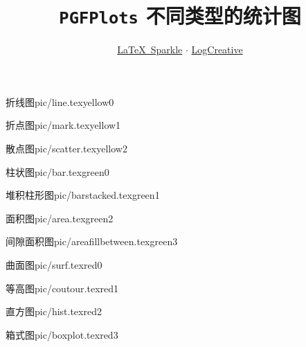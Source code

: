 \documentclass[a4paper,12pt]{article}
\title{\texttt{PGFPlots} 不同类型的统计图}
\author{\href{https://logcreative.github.io/LaTeXSparkle/index.html}{\LaTeX\ Sparkle} $\cdot$ \href{https://space.bilibili.com/31271993}{LogCreative}}
\date{}
\begin{document}
\begin{CJK}{UTF8}{song} %
    \maketitle

    \begin{graphbox}{折线图}{pic/line.tex}{yellow}{0}
    \end{graphbox}
    
    \begin{graphbox}{折点图}{pic/mark.tex}{yellow}{1}
    \end{graphbox}

    \begin{graphbox}{散点图}{pic/scatter.tex}{yellow}{2}
    \end{graphbox}

    \begin{graphbox}{柱状图}{pic/bar.tex}{green}{0}
    \end{graphbox}

    \begin{graphbox}{堆积柱形图}{pic/barstacked.tex}{green}{1}
    \end{graphbox}

    \begin{graphbox}{面积图}{pic/area.tex}{green}{2}
    \end{graphbox}

    \begin{graphbox}{间隙面积图}{pic/areafillbetween.tex}{green}{3}
    \end{graphbox}

    \begin{graphbox}{曲面图}{pic/surf.tex}{red}{0}
    \end{graphbox}

    \begin{graphbox}{等高图}{pic/coutour.tex}{red}{1}
    \end{graphbox}

    \begin{graphbox}{直方图}{pic/hist.tex}{red}{2}
    \end{graphbox}

    \begin{graphbox}{箱式图}{pic/boxplot.tex}{red}{3}
    \end{graphbox}

\end{CJK}
\end{document}
